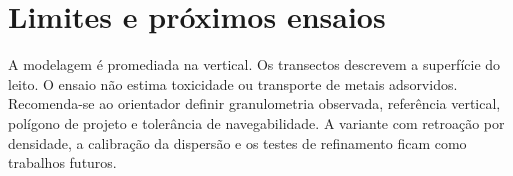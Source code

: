 \documentclass[11pt,a4paper]{article}
\begin{document}
\section{Limites e próximos ensaios}
A modelagem é promediada na vertical. Os transectos descrevem a superfície do leito. O ensaio não estima toxicidade ou transporte de metais adsorvidos. Recomenda-se ao orientador definir granulometria observada, referência vertical, polígono de projeto e tolerância de navegabilidade. A variante com retroação por densidade, a calibração da dispersão e os testes de refinamento ficam como trabalhos futuros.


\end{document}
